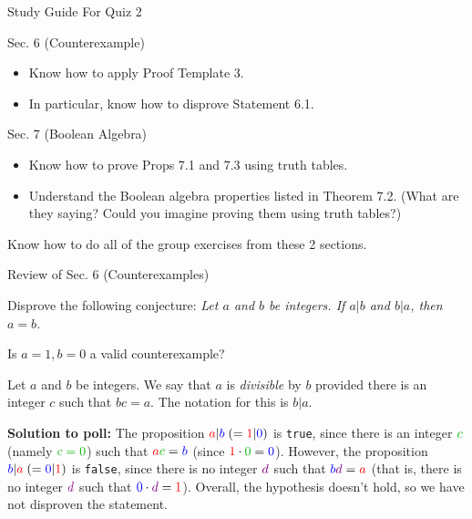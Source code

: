\documentclass[10pt]{beamer}
\begin{document}
\begin{frame}{Study Guide For Quiz 2}


\begin{myredbox}[title=Readings (1 question)]
Sec. 6 (Counterexample)
\begin{itemize}
\item Know how to apply Proof Template 3.
\item In particular, know how to disprove Statement 6.1. 
\end{itemize}
Sec. 7 (Boolean Algebra)
\begin{itemize}
\item Know how to prove Props 7.1 and 7.3 using truth tables.
\item Understand the Boolean algebra properties listed in Theorem 7.2.  (What are they saying? Could you imagine proving them using truth tables?)
\end{itemize}

\end{myredbox}

\vfill 

\begin{myyellowbox}[title=Group exercises (2 questions)]
Know how to do all of the group exercises from these 2 sections.
\end{myyellowbox}

\end{frame}







\begin{frame}{Review of Sec. 6 (Counterexamples)}
\label{frame:assumption_not_met}
 \begin{mygreenbox}
Disprove the following conjecture:  
\textit{Let $a$ and $b$ be integers.  If $a|b$ and $b|a$, then $a=b$.}  
\end{mygreenbox}
\vfill 
\begin{myyellowbox}[title=Poll]
Is $a=1, b=0$ a valid counterexample?
\end{myyellowbox}
\vfill 
\pause 
	\begin{mydef}[title=Reminder of Definition 3.2 (\textbf{Divisible})]
	Let $a$ and $b$ be integers.  We say that $a$ is \textit{divisible} by $b$ provided there is an integer $c$ such that $bc=a$. The notation for this is $b|a$. 
	\end{mydef}
\vfill 	
\pause 
\footnotesize 
\textbf{Solution to poll:} The proposition $\color{red}{a} \color{black}|\color{blue}{b} \color{black} \; (= \color{red}{1} \color{black}|
\color{blue}{0} \color{black})$ is \texttt{true}, since there is an integer $\green{c}$ (namely $\green{c=0}$) such that $\red{a}\green{c}=\blue{b}$ (since $\red{1} \cdot \green{0} = \blue{0}$). However, the proposition $\color{blue}{b} \color{black}|\color{red}{a} \color{black} \; (= \color{blue}{0} \color{black}|\color{red}{1} \color{black})$ is \texttt{false}, since there is no integer $\purple{d}$ such that $\blue{b}\purple{d}=\red{a}$ (that is, there is no integer $\purple{d}$ such that  $\blue{0}\cdot \purple{d} = \red{1}$). Overall, \alert{the hypothesis doesn't hold, so we have not disproven the statement}.  
\end{frame}
\end{document}
